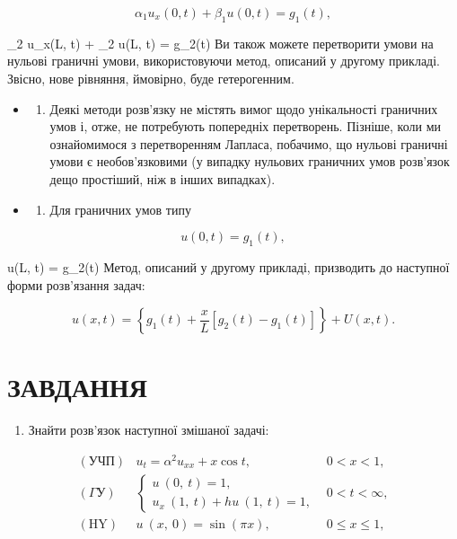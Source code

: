 \documentclass[
  ukrainian,
]{article}
\providecommand{\tightlist}{%
  \setlength{\itemsep}{0pt}\setlength{\parskip}{0pt}}
\begin{document}
\[
\alpha_1 u_x(0, t) + \beta_1 u(0, t) = g_1(t),
\]

\alpha\_2 u\_x(L, t) + \beta\_2 u(L, t) = g\_2(t) Ви також можете
перетворити умови на нульові граничні умови, використовуючи метод,
описаний у другому прикладі. Звісно, нове рівняння, ймовірно, буде
гетерогенним.

\begin{itemize}
\tightlist
\item
  \begin{enumerate}
  \def\labelenumi{\arabic{enumi}.}
  \setcounter{enumi}{2}
  \tightlist
  \item
    Деякі методи розв'язку не містять вимог щодо унікальності граничних
    умов і, отже, не потребують попередніх перетворень. Пізніше, коли ми
    ознайомимося з перетворенням Лапласа, побачимо, що нульові граничні
    умови є необов'язковими (у випадку нульових граничних умов розв'язок
    дещо простіший, ніж в інших випадках).
  \end{enumerate}
\item
  \begin{enumerate}
  \def\labelenumi{\arabic{enumi}.}
  \setcounter{enumi}{3}
  \tightlist
  \item
    Для граничних умов типу
  \end{enumerate}
\end{itemize}

\[
u(0, t) = g_1(t),
\]

u(L, t) = g\_2(t) Метод, описаний у другому прикладі, призводить до
наступної форми розв'язання задач:

\[
u(x, t) = \left\{ g_1(t) + \frac{x}{L} \left[ g_2(t) - g_1(t) \right] \right\} + U(x, t).
\]

\section{ЗАВДАННЯ}\label{ux437ux430ux432ux434ux430ux43dux43dux44f-1}

\begin{enumerate}
\def\labelenumi{\arabic{enumi}.}
\tightlist
\item
  Знайти розв'язок наступної змішаної задачі:
\end{enumerate}

\[
\begin{aligned} (\text{УЧП}) & u_t = \alpha^2 u_{xx} + x \cos t, & 0 < x < 1, \\ (\Gamma \text{У}) & \begin{cases} u \ (0, \ t) = 1, \\ u_x \ (1, \ t) + hu \ (1, \ t) = 1, \end{cases} & 0 < t < \infty, \\ (\text{HY}) & u \ (x, \ 0) = \sin (\pi x), & 0 \leqslant x \leqslant 1, \end{aligned}
\]
\end{document}
